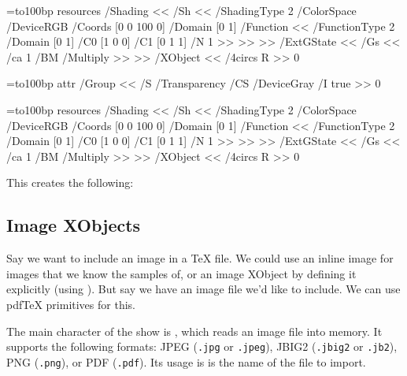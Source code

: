 =\hbox to100bp{\vrule width0bp height100bp depth0bp%
\hfil}
\pdfxform resources {
    /Shading << /Sh <<
        /ShadingType 2
        /ColorSpace /DeviceRGB
        /Coords [0 0 100 0]
        /Domain [0 1]
        /Function <<
            /FunctionType 2
            /Domain [0 1]
            /C0 [1 0 0]
            /C1 [0 1 1]
            /N 1
        >>
    >> >>
    /ExtGState << /Gs <<
        /ca 1
        /BM /Multiply
    >> >>
    /XObject <<
        /4circs \fourcircsform{} R
    >>
}0
\xdef\fourcircs{\pdfrefxform\the\pdflastxform\relax}
\egroup
\elisting

\bgroup
{}=\hbox to100bp{\vrule width0bp height100bp depth0bp%
\hfil}
\immediate\pdfxform attr{
    /Group <<
        /S /Transparency
        /CS /DeviceGray
        /I true
    >>
}0
\edef\fourcircsform{\the\pdflastxform}

=\hbox to100bp{\vrule width0bp height100bp depth0bp%
\hfil}
\pdfxform resources {
    /Shading << /Sh <<
        /ShadingType 2
        /ColorSpace /DeviceRGB
        /Coords [0 0 100 0]
        /Domain [0 1]
        /Function <<
            /FunctionType 2
            /Domain [0 1]
            /C0 [1 0 0]
            /C1 [0 1 1]
            /N 1
        >>
    >> >>
    /ExtGState << /Gs <<
        /ca 1
        /BM /Multiply
    >> >>
    /XObject <<
        /4circs \fourcircsform{} R
    >>
}0
\xdef\fourcircs{\pdfrefxform\the\pdflastxform\relax}
\egroup

This creates the following:

\centerline{\fourcircs}

\subsection{Image XObjects}

Say we want to include an image in a \TeX{} file.
We could use an inline image for images that we know the samples of, or an image XObject by defining it
explicitly (using \macro\pdfobj).
But say we have an image file we'd like to include.
We can use pdf\TeX{} primitives for this.

The main character of the show is \macro\pdfximage, which reads an image file into memory.
It supports the following formats: JPEG ({\tt.jpg} or {\tt.jpeg}), JBIG2 ({\tt.jbig2} or {\tt.jb2}), PNG
({\tt.png}), or PDF ({\tt.pdf}).
Its usage is
 is the name of the file to import.


